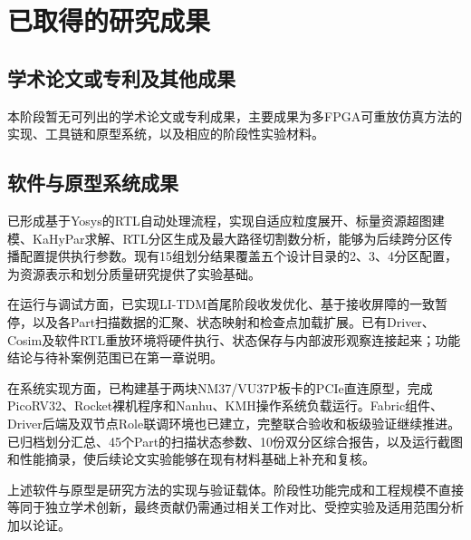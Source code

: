 \chapter{已取得的研究成果}

\section{学术论文或专利及其他成果}

本阶段暂无可列出的学术论文或专利成果，主要成果为多FPGA可重放仿真方法的实现、工具链和原型系统，以及相应的阶段性实验材料。


\section{软件与原型系统成果}

已形成基于Yosys的RTL自动处理流程，实现自适应粒度展开、标量资源超图建模、KaHyPar求解、RTL分区生成及最大路径切割数分析，能够为后续跨分区传播配置提供执行参数。现有15组划分结果覆盖五个设计目录的2、3、4分区配置，为资源表示和划分质量研究提供了实验基础。

在运行与调试方面，已实现LI-TDM首尾阶段收发优化、基于接收屏障的一致暂停，以及各Part扫描数据的汇聚、状态映射和检查点加载扩展。已有Driver、Cosim及软件RTL重放环境将硬件执行、状态保存与内部波形观察连接起来；功能结论与待补案例范围已在第一章说明。

在系统实现方面，已构建基于两块NM37/VU37P板卡的PCIe直连原型，完成PicoRV32、Rocket裸机程序和Nanhu、KMH操作系统负载运行。Fabric组件、Driver后端及双节点Role联调环境也已建立，完整联合验收和板级验证继续推进。已归档划分汇总、45个Part的扫描状态参数、10份双分区综合报告，以及运行截图和性能摘录，使后续论文实验能够在现有材料基础上补充和复核。

上述软件与原型是研究方法的实现与验证载体。阶段性功能完成和工程规模不直接等同于独立学术创新，最终贡献仍需通过相关工作对比、受控实验及适用范围分析加以论证。
